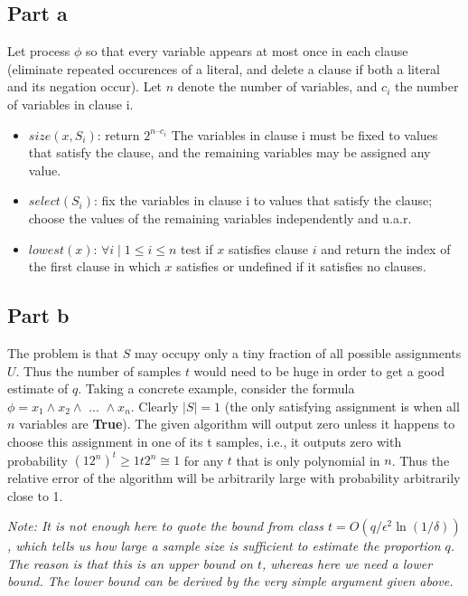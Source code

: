 \documentclass[12pt, a4paper]{article}
\begin{document}
\subsection{Part a}

Let process $\phi$ so that every variable appears at most once in each clause
(eliminate repeated occurences of a literal, and delete a clause if both a literal and its negation
occur). Let $n$ denote the number of variables, and $c_i$ the number of variables in
clause i.

\begin{itemize}
\item $size(x, S_i)$: return $2^{n–c_i}$ The variables in clause i must be fixed
  to values that satisfy the clause, and the remaining variables may be assigned any value.
\item $select(S_i)$: fix the variables in clause i to values that satisfy the
  clause; choose the values of the remaining variables independently and u.a.r.
\item $lowest(x)$: $\forall i \mid 1 \leq i \leq n$ test if $x$ satisfies clause
  $i$ and return the index of the first clause in which $x$ satisfies or undefined if it satisfies no clauses.
\end{itemize}

\subsection{Part b}
The problem is that $S$ may occupy only a tiny fraction of all possible
assignments $U$. Thus the number of samples $t$ would need to be huge in order
to get a good estimate of $q$. Taking a concrete example, consider the formula
$\phi = x_1 \wedge x_2 \wedge \text{ ... } \wedge x_n$. Clearly $|S| = 1$ (the only
satisfying assignment is when all $n$ variables are \textbf{True}). The given
algorithm will output zero unless it happens to choose this assignment in one of
its t samples, i.e., it outputs zero with probability $(12^n)^t \geq 1t2^n \cong
1$ for any $t$ that is only polynomial in $n$. Thus the relative error of the
algorithm will be arbitrarily large with probability arbitrarily close to 1.

\textit{Note: It is not enough here to quote the bound from class $t =
  O(q/\epsilon^2\ln(1/\delta))$, which tells us how large a sample size is
  sufficient to estimate the proportion $q$. The reason is that this is an upper
  bound on $t$, whereas here we need a lower bound. The lower bound can be
  derived by the very simple argument given above.}
\end{document}
